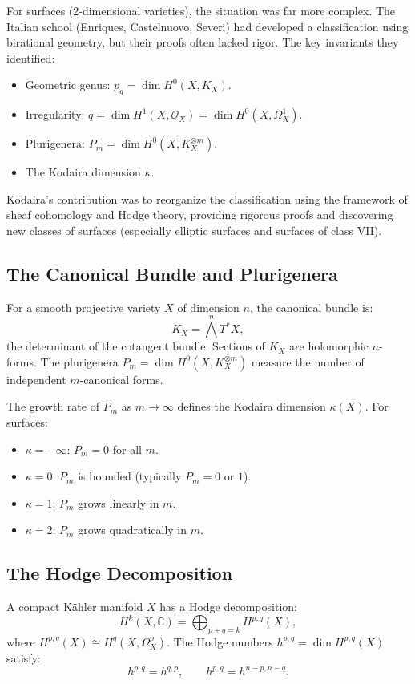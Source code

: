 For surfaces (2-dimensional varieties), the situation was far more complex. The Italian school (Enriques, Castelnuovo, Severi) had developed a classification using birational geometry, but their proofs often lacked rigor. The key invariants they identified:
\begin{itemize}
    \item Geometric genus: $p_g = \dim H^0(X, K_X)$.
    \item Irregularity: $q = \dim H^1(X, \mathcal{O}_X) = \dim H^0(X, \Omega^1_X)$.
    \item Plurigenera: $P_m = \dim H^0(X, K_X^{\otimes m})$.
    \item The Kodaira dimension $\kappa$.
\end{itemize}

Kodaira's contribution was to reorganize the classification using the framework of sheaf cohomology and Hodge theory, providing rigorous proofs and discovering new classes of surfaces (especially elliptic surfaces and surfaces of class VII).

\subsection{The Canonical Bundle and Plurigenera}

For a smooth projective variety $X$ of dimension $n$, the canonical bundle is:
\[
K_X = \bigwedge^n T^*X,
\]
the determinant of the cotangent bundle. Sections of $K_X$ are holomorphic $n$-forms. The plurigenera $P_m = \dim H^0(X, K_X^{\otimes m})$ measure the number of independent $m$-canonical forms.

The growth rate of $P_m$ as $m \to \infty$ defines the Kodaira dimension $\kappa(X)$. For surfaces:
\begin{itemize}
    \item $\kappa = -\infty$: $P_m = 0$ for all $m$.
    \item $\kappa = 0$: $P_m$ is bounded (typically $P_m = 0$ or $1$).
    \item $\kappa = 1$: $P_m$ grows linearly in $m$.
    \item $\kappa = 2$: $P_m$ grows quadratically in $m$.
\end{itemize}

\subsection{The Hodge Decomposition}

A compact K\"{a}hler manifold $X$ has a Hodge decomposition:
\[
H^k(X, \mathbb{C}) = \bigoplus_{p+q=k} H^{p,q}(X),
\]
where $H^{p,q}(X) \cong H^q(X, \Omega^p_X)$. The Hodge numbers $h^{p,q} = \dim H^{p,q}(X)$ satisfy:
\[
h^{p,q} = h^{q,p}, \qquad h^{p,q} = h^{n-p, n-q}.
\]

